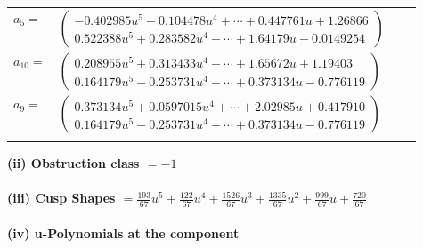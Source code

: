 \documentclass[1p]{elsarticle_modified}
\theoremstyle{definition}
\begin{document}
\begin{tabular}{m{7pt} m{180pt} m{7pt} m{180pt} }
\flushright $a_{5}=$&$\begin{pmatrix}-0.402985 u^{5}-0.104478 u^{4}+\cdots+0.447761 u+1.26866\\0.522388 u^{5}+0.283582 u^{4}+\cdots+1.64179 u-0.0149254\end{pmatrix}$ \\
\flushright $a_{10}=$&$\begin{pmatrix}0.208955 u^{5}+0.313433 u^{4}+\cdots+1.65672 u+1.19403\\0.164179 u^{5}-0.253731 u^{4}+\cdots+0.373134 u-0.776119\end{pmatrix}$ \\
\flushright $a_{9}=$&$\begin{pmatrix}0.373134 u^{5}+0.0597015 u^{4}+\cdots+2.02985 u+0.417910\\0.164179 u^{5}-0.253731 u^{4}+\cdots+0.373134 u-0.776119\end{pmatrix}$\\&\end{tabular}
\flushleft \textbf{(ii) Obstruction class $= -1$}\\~\\
\flushleft \textbf{(iii) Cusp Shapes $= \frac{193}{67} u^5+\frac{122}{67} u^4+\frac{1526}{67} u^3+\frac{1335}{67} u^2+\frac{999}{67} u+\frac{720}{67}$}\\~\\
\newpage\renewcommand{\arraystretch}{1}
\flushleft \textbf{(iv) u-Polynomials at the component}\newline \\
\end{document}
